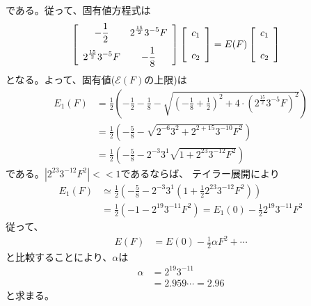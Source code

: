 である。従って、固有値方程式は
\begin{align}
	\left[
	\begin{array}{*2{>{\displaystyle}c}}
		-\frac{1}{2} &
		2^{\frac{15}{2}} 3^{-5} F \\[3mm]
		2^{\frac{15}{2}} 3^{-5} F &
		-\frac{1}{8}
	\end{array}
	\right]
		\left[
		\begin{array}{c}
			c_1 \\[4mm] c_2
		\end{array}
		\right]
&=
	E(F)
		\left[
		\begin{array}{c}
			c_1 \\[4mm] c_2
		\end{array}
		\right]
\end{align}
となる。よって、固有値($\mathscr{E}(F)$の上限)は
\begin{align}
	E_1(F)
&=
	\frac{1}{2}
		\left(
			-
			\frac{1}{2}
			-
			\frac{1}{8}
			-
			\sqrt{
				\left(
					-
					\frac{1}{8}
					+
					\frac{1}{2}
				\right)^2
				+
				4 \cdot \left(2^{\frac{15}{2}}3^{-5}F\right)^2
			}
		\right) \\
%
%
&=
	\frac{1}{2}
		\left(
			-
			\frac{5}{8}
			-
			\sqrt{
				2^{-6} 3^2
				+
				2^{2+15} 3^{-10} F^2
			}
		\right) \\
%
%
&=
	\frac{1}{2}
		\left(
			-
			\frac{5}{8}
			-
			2^{-3} 3^1
				\sqrt{
					1
					+
					2^{23} 3^{-12} F^2
				}
		\right)
\end{align}
である。$|2^{23} 3^{-12} F^2|<<1$であるならば、
テイラー展開により
\begin{align}
	E_1(F)
&\simeq
	\frac{1}{2}
		\left(
			-
			\frac{5}{8}
			-
			2^{-3} 3^1
				\left(
					1
					+
					\frac{1}{2} 2^{23} 3^{-12} F^2
				\right)
		\right) \\
%
%
&=
	\frac{1}{2}
		\left(
			-
			1
			-
			2^{19} 3^{-11} F^2
		\right)
%
%
=
	E_1(0)
	-
	\frac{1}{2}
		2^{19} 3^{-11} F^2
\end{align}
従って、
\begin{align}
	E(F)
&=
	E(0)
	-
	\frac{1}{2} \alpha F^2
	+
	\cdots
\end{align}
と比較することにより、$\alpha$は
\begin{align}
	\alpha
&=
	2^{19} 3^{-11} \\
%
%
&=
	2.959\cdots
=
	2.96
\end{align}
と求まる。



